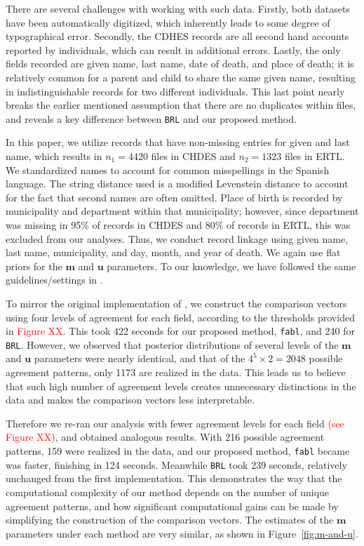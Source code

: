 \documentclass[12pt,letterpaper]{article}
\newcommand{\1}[1]{\mathbb{I}\!\left[#1\right]} %
\begin{document}
There are several challenges with working with such data. Firstly, both
datasets have been automatically digitized, which inherently leads to
some degree of typographical error. Secondly, the CDHES records are all
second hand accounts reported by individuals, which can result in
additional errors. Lastly, the only fields recorded are given name, last
name, date of death, and place of death; it is relatively common for a
parent and child to share the same given name, resulting in
indistinguishable records for two different individuals. This last point
nearly breaks the earlier mentioned assumption that there are no
duplicates within files, and reveals a key difference between
\texttt{BRL} and our proposed method.

In this paper, we utilize records that have non-missing entries for given and last name, which results 
in \(n_1 = 4420\) files in CHDES and \(n_2 = 1323\) files
in ERTL. We standardized names to account for common misspellings
in the Spanish language. The string distance used is a modified Levenstein
distance to account for the fact that second names are often omitted.
Place of birth is recorded by municipality and department within that
municipality; however, since department was missing in 95\% of records
in CHDES and 80\% of records in ERTL, this was excluded from our analyses. 
Thus, we conduct record linkage using given name, last name,
municipality, and day, month, and year of death. We again use flat
priors for the \(\mathbf{m}\) and \(\mathbf{u}\) parameters. To our knowledge, we have followed the same guidelines/settings in \cite{sadinle_bayesian_2017}.

To mirror the original implementation of \cite{sadinle_bayesian_2017}, we construct the comparison
vectors using four levels of agreement for each field, according to the
thresholds provided in \textcolor{red}{Figure XX}. This took 422 seconds for our proposed
method, \texttt{fabl}, and 240 for \texttt{BRL}. However, we observed that posterior
distributions of several levels of the \(\mathbf{m}\) and \(\mathbf{u}\)
parameters were nearly identical, and that of the
\(4^5 \times 2 = 2048\) possible agreement patterns, only 1173 are
realized in the data. This leads us to believe that such high number of
agreement levels creates unnecessary distinctions in the data and makes
the comparison vectors less interpretable. 

Therefore we re-ran our analysis with fewer agreement levels for each field \textcolor{red}{(see Figure XX)}, and
obtained analogous results. With 216 possible agreement patterns, 159
were realized in the data, and our proposed method, \texttt{fabl} became was faster,
finishing in 124 seconds. Meanwhile \texttt{BRL} took 239 seconds,
relatively unchanged from the first implementation. This demonstrates
the way that the computational complexity of our method depends on the
number of unique agreement patterns, and how significant computational
gains can be made by simplifying the construction of the comparison
vectors. The estimates of the \(\mathbf{m}\) parameters under each method are very similar, as shown in
Figure~\ref{fig:m-and-u}.
\end{document}

